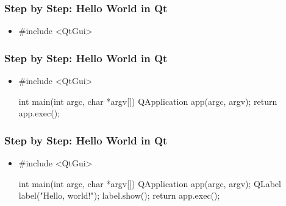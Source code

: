 \begin{slide}[fragile]
  \frametitle{Step by Step: Hello World in Qt}
  \begin{itemize}
  \item[]
    \begin{cpp}
#include <QtGui>
    \end{cpp}
  \end{itemize}
\end{slide}

\begin{slide}[fragile]
  \frametitle{Step by Step: Hello World in Qt}
  \begin{itemize}
  \item[]
    \begin{cpp}
#include <QtGui>

int main(int argc, char *argv[])
{
    QApplication app(argc, argv);
    return app.exec();
}
    \end{cpp}
  \end{itemize}
\end{slide}

\begin{slide}[fragile]
  \frametitle{Step by Step: Hello World in Qt}
  \begin{itemize}
  \item[]
    \begin{cpp}
#include <QtGui>

int main(int argc, char *argv[])
{
    QApplication app(argc, argv);
    QLabel label("Hello, world!");
    label.show();
    return app.exec();
}
    \end{cpp}
  \end{itemize}
\end{slide}
